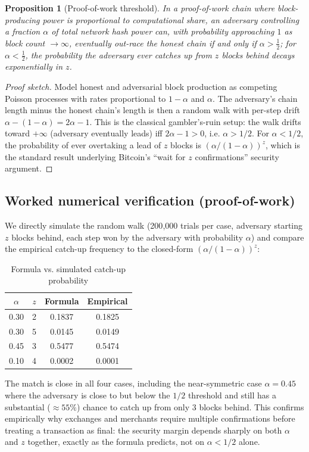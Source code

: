 \documentclass[10pt,journal,compsoc]{IEEEtran}
\newtheorem{proposition}{Proposition}
\begin{document}
\begin{proposition}[Proof-of-work threshold]
In a proof-of-work chain where block-producing power is proportional to computational share, an adversary controlling a fraction $\alpha$ of total network hash power can, with probability approaching $1$ as block count $\to \infty$, eventually out-race the honest chain if and only if $\alpha > \tfrac12$; for $\alpha < \tfrac12$, the probability the adversary ever catches up from $z$ blocks behind decays exponentially in $z$.
\end{proposition}
\begin{proof}[Proof sketch]
Model honest and adversarial block production as competing Poisson processes with rates proportional to $1-\alpha$ and $\alpha$. The adversary's chain length minus the honest chain's length is then a random walk with per-step drift $\alpha - (1-\alpha) = 2\alpha - 1$. This is the classical gambler's-ruin setup: the walk drifts toward $+\infty$ (adversary eventually leads) iff $2\alpha - 1 > 0$, i.e. $\alpha > 1/2$. For $\alpha<1/2$, the probability of ever overtaking a lead of $z$ blocks is $(\alpha/(1-\alpha))^{z}$, which is the standard result underlying Bitcoin's ``wait for $z$ confirmations'' security argument.
\end{proof}

\subsection{Worked numerical verification (proof-of-work)}
We directly simulate the random walk (200{,}000 trials per case, adversary starting $z$ blocks behind, each step won by the adversary with probability $\alpha$) and compare the empirical catch-up frequency to the closed-form $(\alpha/(1-\alpha))^{z}$:

\begin{table}[h]
\centering
\caption{Formula vs. simulated catch-up probability}
\begin{tabular}{cccc}
\toprule
$\alpha$ & $z$ & Formula & Empirical \\
\midrule
0.30 & 2 & 0.1837 & 0.1825 \\
0.30 & 5 & 0.0145 & 0.0149 \\
0.45 & 3 & 0.5477 & 0.5474 \\
0.10 & 4 & 0.0002 & 0.0001 \\
\bottomrule
\end{tabular}
\end{table}

The match is close in all four cases, including the near-symmetric case $\alpha=0.45$ where the adversary is close to but below the $1/2$ threshold and still has a substantial ($\approx55\%$) chance to catch up from only $3$ blocks behind. This confirms empirically why exchanges and merchants require multiple confirmations before treating a transaction as final: the security margin depends sharply on both $\alpha$ and $z$ together, exactly as the formula predicts, not on $\alpha<1/2$ alone.
\end{document}
